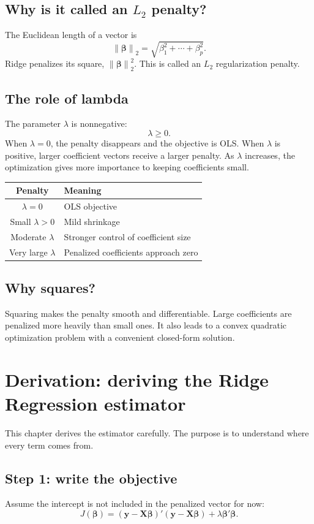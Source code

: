 \documentclass[11pt,a4paper]{article}
\numberwithin{equation}{section}
\theoremstyle{remark}
\newcommand{\X}{\mathbf X}
\newcommand{\y}{\mathbf y}
\newcommand{\bta}{\boldsymbol{\beta}}
\newcommand{\norm}[1]{\left\lVert #1\right\rVert_2}
\begin{document}
\subsection{Why is it called an \texorpdfstring{$L_2$}{L2} penalty?}
The Euclidean length of a vector is
\[
\norm{\bta}=\sqrt{\beta_1^2+\cdots+\beta_p^2}.
\]
Ridge penalizes its square, $\norm{\bta}^2$. This is called an $L_2$
regularization penalty.

\subsection{The role of lambda}
The parameter $\lambda$ is nonnegative:
\[
\lambda\geq 0.
\]
When $\lambda=0$, the penalty disappears and the objective is OLS.
When $\lambda$ is positive, larger coefficient vectors receive a larger
penalty. As $\lambda$ increases, the optimization gives more importance
to keeping coefficients small.

\begin{center}
\begin{tabular}{@{}cl@{}}
\toprule
Penalty & Meaning\\
\midrule
$\lambda=0$ & OLS objective\\
Small $\lambda>0$ & Mild shrinkage\\
Moderate $\lambda$ & Stronger control of coefficient size\\
Very large $\lambda$ & Penalized coefficients approach zero\\
\bottomrule
\end{tabular}
\end{center}

\subsection{Why squares?}
Squaring makes the penalty smooth and differentiable. Large coefficients
are penalized more heavily than small ones. It also leads to a convex
quadratic optimization problem with a convenient closed-form solution.

\section{Derivation: deriving the Ridge Regression estimator}

This chapter derives the estimator carefully. The purpose is to understand
where every term comes from.

\subsection{Step 1: write the objective}
Assume the intercept is not included in the penalized vector for now:
\[
J(\bta)=(\y-\X\bta)'(\y-\X\bta)+\lambda\bta'\bta.
\]
\end{document}
